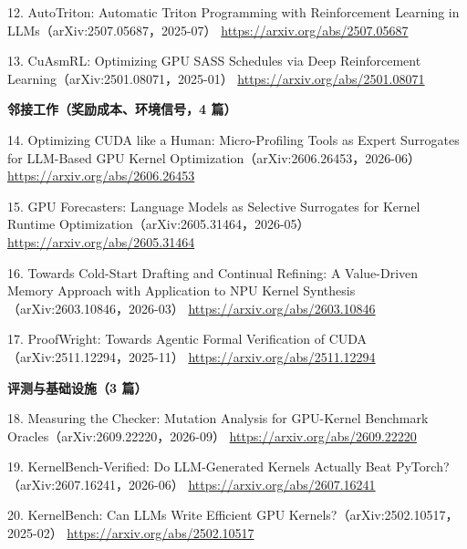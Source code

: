 \begin{refs}
12. AutoTriton: Automatic Triton Programming with Reinforcement Learning in LLMs（arXiv:2507.05687，2025-07）  
   \url{https://arxiv.org/abs/2507.05687}

13. CuAsmRL: Optimizing GPU SASS Schedules via Deep Reinforcement Learning（arXiv:2501.08071，2025-01）  
   \url{https://arxiv.org/abs/2501.08071}

\textbf{邻接工作（奖励成本、环境信号，4 篇）}

14. Optimizing CUDA like a Human: Micro-Profiling Tools as Expert Surrogates for LLM-Based GPU Kernel Optimization（arXiv:2606.26453，2026-06）  
   \url{https://arxiv.org/abs/2606.26453}

15. GPU Forecasters: Language Models as Selective Surrogates for Kernel Runtime Optimization（arXiv:2605.31464，2026-05）  
   \url{https://arxiv.org/abs/2605.31464}

16. Towards Cold-Start Drafting and Continual Refining: A Value-Driven Memory Approach with Application to NPU Kernel Synthesis（arXiv:2603.10846，2026-03）  
   \url{https://arxiv.org/abs/2603.10846}

17. ProofWright: Towards Agentic Formal Verification of CUDA（arXiv:2511.12294，2025-11）  
   \url{https://arxiv.org/abs/2511.12294}

\textbf{评测与基础设施（3 篇）}

18. Measuring the Checker: Mutation Analysis for GPU-Kernel Benchmark Oracles（arXiv:2609.22220，2026-09）  
   \url{https://arxiv.org/abs/2609.22220}

19. KernelBench-Verified: Do LLM-Generated Kernels Actually Beat PyTorch?（arXiv:2607.16241，2026-06）  
   \url{https://arxiv.org/abs/2607.16241}

20. KernelBench: Can LLMs Write Efficient GPU Kernels?（arXiv:2502.10517，2025-02）  
   \url{https://arxiv.org/abs/2502.10517}
\end{refs}
